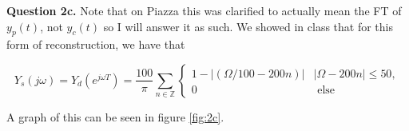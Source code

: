 \documentclass[letterpaper, reqno,11pt]{article}
\newcommand{\ZZ}{\mathbb{Z}}
\begin{document}
{\noindent\bf Question 2c.} Note that on Piazza this was clarified to actually mean the FT of $y_p(t)$, not $y_c(t)$ so I will answer it as such. We showed in class that for this form of reconstruction, we have that 

\[
    Y_s(j\omega)=Y_d(e^{j\omega T})=\frac{100}\pi\sum_{n\in\ZZ}\begin{cases}1-|(\Omega/100-200 n)|&|\Omega-200 n|\leq 50,\\0&\text{ else}\end{cases}
\]

A graph of this can be seen in figure \ref{fig:2c}. 




\end{document}
